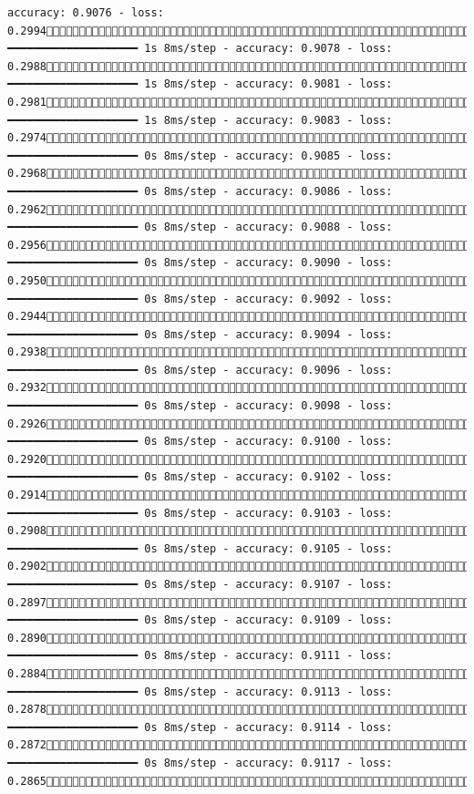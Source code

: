 \documentclass[
  letterpaper,
  DIV=11,
  numbers=noendperiod]{scrreprt}
\begin{document}
\begin{verbatim}
accuracy: 0.9076 - loss: 0.29941733/1875 ━━━━━━━━━━━━━━━━━━━━ 1s 8ms/step - accuracy: 0.9078 - loss: 0.29881740/1875 ━━━━━━━━━━━━━━━━━━━━ 1s 8ms/step - accuracy: 0.9081 - loss: 0.29811747/1875 ━━━━━━━━━━━━━━━━━━━━ 1s 8ms/step - accuracy: 0.9083 - loss: 0.29741754/1875 ━━━━━━━━━━━━━━━━━━━━ 0s 8ms/step - accuracy: 0.9085 - loss: 0.29681760/1875 ━━━━━━━━━━━━━━━━━━━━ 0s 8ms/step - accuracy: 0.9086 - loss: 0.29621767/1875 ━━━━━━━━━━━━━━━━━━━━ 0s 8ms/step - accuracy: 0.9088 - loss: 0.29561774/1875 ━━━━━━━━━━━━━━━━━━━━ 0s 8ms/step - accuracy: 0.9090 - loss: 0.29501780/1875 ━━━━━━━━━━━━━━━━━━━━ 0s 8ms/step - accuracy: 0.9092 - loss: 0.29441787/1875 ━━━━━━━━━━━━━━━━━━━━ 0s 8ms/step - accuracy: 0.9094 - loss: 0.29381794/1875 ━━━━━━━━━━━━━━━━━━━━ 0s 8ms/step - accuracy: 0.9096 - loss: 0.29321800/1875 ━━━━━━━━━━━━━━━━━━━━ 0s 8ms/step - accuracy: 0.9098 - loss: 0.29261807/1875 ━━━━━━━━━━━━━━━━━━━━ 0s 8ms/step - accuracy: 0.9100 - loss: 0.29201814/1875 ━━━━━━━━━━━━━━━━━━━━ 0s 8ms/step - accuracy: 0.9102 - loss: 0.29141821/1875 ━━━━━━━━━━━━━━━━━━━━ 0s 8ms/step - accuracy: 0.9103 - loss: 0.29081827/1875 ━━━━━━━━━━━━━━━━━━━━ 0s 8ms/step - accuracy: 0.9105 - loss: 0.29021833/1875 ━━━━━━━━━━━━━━━━━━━━ 0s 8ms/step - accuracy: 0.9107 - loss: 0.28971841/1875 ━━━━━━━━━━━━━━━━━━━━ 0s 8ms/step - accuracy: 0.9109 - loss: 0.28901848/1875 ━━━━━━━━━━━━━━━━━━━━ 0s 8ms/step - accuracy: 0.9111 - loss: 0.28841855/1875 ━━━━━━━━━━━━━━━━━━━━ 0s 8ms/step - accuracy: 0.9113 - loss: 0.28781862/1875 ━━━━━━━━━━━━━━━━━━━━ 0s 8ms/step - accuracy: 0.9114 - loss: 0.28721870/1875 ━━━━━━━━━━━━━━━━━━━━ 0s 8ms/step - accuracy: 0.9117 - loss: 0.28651875/1875 
\end{verbatim}
\end{document}
